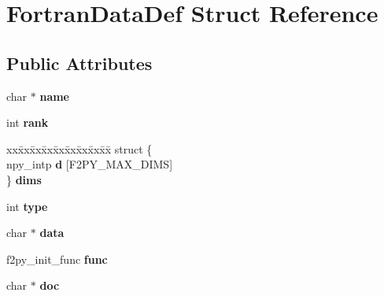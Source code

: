 \hypertarget{structFortranDataDef}{}\section{Fortran\+Data\+Def Struct Reference}
\label{structFortranDataDef}
\subsection*{Public Attributes}
\begin{DoxyCompactItemize}
\item 
char $\ast$ {\bfseries name}\hypertarget{structFortranDataDef_a92f20a73720f0cd46d9c062ecddb226c}{}\label{structFortranDataDef_a92f20a73720f0cd46d9c062ecddb226c}

\item 
int {\bfseries rank}\hypertarget{structFortranDataDef_a5058ec159b7749be16aed072fd747512}{}\label{structFortranDataDef_a5058ec159b7749be16aed072fd747512}

\item 
\begin{tabbing}
xx\=xx\=xx\=xx\=xx\=xx\=xx\=xx\=xx\=\kill
struct \{\\
\>npy\_intp {\bfseries d} \mbox{[}F2PY\_MAX\_DIMS\mbox{]}\\
\} {\bfseries dims}\hypertarget{structFortranDataDef_ab09eee2072a515e51285020992f96b11}{}\label{structFortranDataDef_ab09eee2072a515e51285020992f96b11}
\\

\end{tabbing}\item 
int {\bfseries type}\hypertarget{structFortranDataDef_af8064eaf55b569cc849e1b77f1e34abd}{}\label{structFortranDataDef_af8064eaf55b569cc849e1b77f1e34abd}

\item 
char $\ast$ {\bfseries data}\hypertarget{structFortranDataDef_a69aea5e156b0997db5e751e2726369b6}{}\label{structFortranDataDef_a69aea5e156b0997db5e751e2726369b6}

\item 
f2py\+\_\+init\+\_\+func {\bfseries func}\hypertarget{structFortranDataDef_a660c9e10cf3051d67216f583c5978760}{}\label{structFortranDataDef_a660c9e10cf3051d67216f583c5978760}

\item 
char $\ast$ {\bfseries doc}\hypertarget{structFortranDataDef_a42e105111f776e93f511e629b165d270}{}\label{structFortranDataDef_a42e105111f776e93f511e629b165d270}

\end{DoxyCompactItemize}


